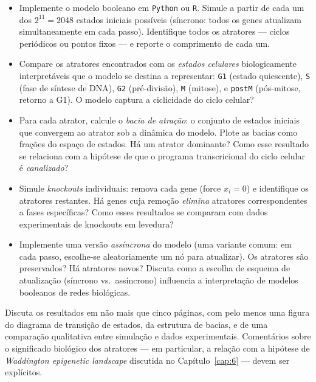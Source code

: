 \begin{exercicio}[$\star\star\star$]
\begin{itemize}
  \item[(a)] Implemente o modelo booleano em \texttt{Python} ou \texttt{R}. Simule a partir de cada um dos \(2^{11} = 2048\) estados iniciais possíveis (síncrono: todos os genes atualizam simultaneamente em cada passo). Identifique todos os atratores --- ciclos periódicos ou pontos fixos --- e reporte o comprimento de cada um.
  \item[(b)] Compare os atratores encontrados com os \emph{estados celulares} biologicamente interpretáveis que o modelo se destina a representar: \texttt{G1} (estado quiescente), \texttt{S} (fase de síntese de DNA), \texttt{G2} (pré-divisão), \texttt{M} (mitose), e \texttt{postM} (pós-mitose, retorno a G1). O modelo captura a ciclicidade do ciclo celular?
  \item[(c)] Para cada atrator, calcule o \emph{bacia de atração}: o conjunto de estados iniciais que convergem ao atrator sob a dinâmica do modelo. Plote as bacias como frações do espaço de estados. Há um atrator dominante? Como esse resultado se relaciona com a hipótese de que o programa transcricional do ciclo celular é \emph{canalizado}?
  \item[(d)] Simule \emph{knockouts} individuais: remova cada gene (force \(x_i = 0\)) e identifique os atratores restantes. Há genes cuja remoção \emph{elimina} atratores correspondentes a fases específicas? Como esses resultados se comparam com dados experimentais de knockouts em levedura?
  \item[(e)] Implemente uma versão \emph{assíncrona} do modelo (uma variante comum: em cada passo, escolhe-se aleatoriamente um nó para atualizar). Os atratores são preservados? Há atratores novos? Discuta como a escolha de esquema de atualização (síncrono vs.\ assíncrono) influencia a interpretação de modelos booleanos de redes biológicas.
\end{itemize}
Discuta os resultados em não mais que cinco páginas, com pelo menos uma figura do diagrama de transição de estados, da estrutura de bacias, e de uma comparação qualitativa entre simulação e dados experimentais. Comentários sobre o significado biológico dos atratores --- em particular, a relação com a hipótese de \emph{Waddington epigenetic landscape} discutida no Capítulo~\ref{cap:6} --- devem ser explícitos.
\end{exercicio}



